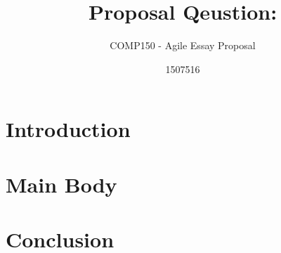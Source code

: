 \documentclass{scrartcl}
\title{Proposal Qeustion:}
\subtitle{COMP150 - Agile Essay Proposal}
\author{1507516}
\begin{document}
\maketitle




\section{Introduction}



\section{Main Body}


\section{Conclusion}





\end{document}
